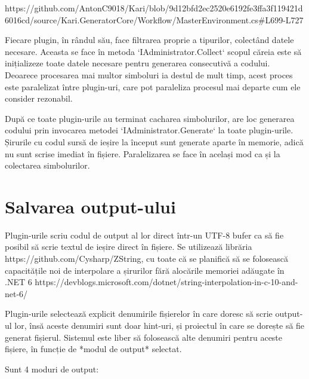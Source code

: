 \documentclass{report}
\begin{document}
https://github.com/AntonC9018/Kari/blob/9d12bfd2ec2520e6192fe3ffa3f119421d6016cd/source/Kari.GeneratorCore/Workflow/MasterEnvironment.cs#L699-L727

Fiecare plugin, în rândul său, face filtrarea proprie a tipurilor, colectând datele necesare.
Aceasta se face în metoda `IAdministrator.Collect` scopul căreia este să inițializeze toate datele necesare pentru generarea consecutivă a codului.
Deoarece procesarea mai multor simboluri ia destul de mult timp, acest proces este paralelizat între plugin-uri, care pot paraleliza procesul mai departe cum ele consider rezonabil.

După ce toate plugin-urile au terminat cacharea simbolurilor, are loc generarea codului prin invocarea metodei `IAdministrator.Generate` la toate plugin-urile.
Șirurile cu codul sursă de ieșire la început sunt generate aparte în memorie, adică nu sunt scrise imediat în fișiere.
Paralelizarea se face în același mod ca și la colectarea simbolurilor.

\section{Salvarea output-ului}

Plugin-urile scriu codul de output al lor direct într-un UTF-8 bufer ca să fie posibil să scrie textul de ieșire direct în fișiere.
Se utilizează librăria https://github.com/Cysharp/ZString, cu toate că se planifică să se folosească capacitățile noi de interpolare a șirurilor fără alocările memoriei adăugate în .NET 6 https://devblogs.microsoft.com/dotnet/string-interpolation-in-c-10-and-net-6/

Plugin-urile selectează explicit denumirile fișierelor în care doresc să scrie output-ul lor, însă aceste denumiri sunt doar hint-uri, și proiectul în care se dorește să fie generat fișierul.
Sistemul este liber să folosească alte denumiri pentru aceste fișiere, în funcție de *modul de output* selectat.

Sunt 4 moduri de output:
\end{document}
